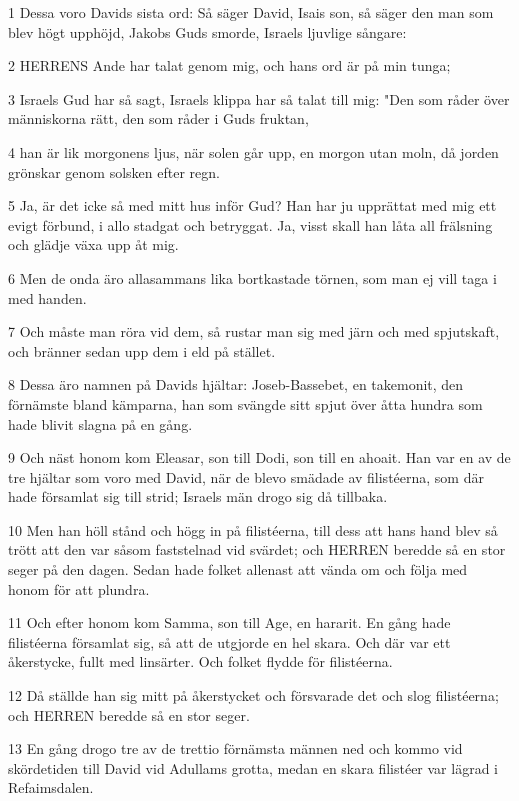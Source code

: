 \par 1 Dessa voro Davids sista ord: Så säger David, Isais son, så säger den man som blev högt upphöjd, Jakobs Guds smorde, Israels ljuvlige sångare:
\par 2 HERRENS Ande har talat genom mig, och hans ord är på min tunga;
\par 3 Israels Gud har så sagt, Israels klippa har så talat till mig: "Den som råder över människorna rätt, den som råder i Guds fruktan,
\par 4 han är lik morgonens ljus, när solen går upp, en morgon utan moln, då jorden grönskar genom solsken efter regn.
\par 5 Ja, är det icke så med mitt hus inför Gud? Han har ju upprättat med mig ett evigt förbund, i allo stadgat och betryggat. Ja, visst skall han låta all frälsning och glädje växa upp åt mig.
\par 6 Men de onda äro allasammans lika bortkastade törnen, som man ej vill taga i med handen.
\par 7 Och måste man röra vid dem, så rustar man sig med järn och med spjutskaft, och bränner sedan upp dem i eld på stället.
\par 8 Dessa äro namnen på Davids hjältar: Joseb-Bassebet, en takemonit, den förnämste bland kämparna, han som svängde sitt spjut över åtta hundra som hade blivit slagna på en gång.
\par 9 Och näst honom kom Eleasar, son till Dodi, son till en ahoait. Han var en av de tre hjältar som voro med David, när de blevo smädade av filistéerna, som där hade församlat sig till strid; Israels män drogo sig då tillbaka.
\par 10 Men han höll stånd och högg in på filistéerna, till dess att hans hand blev så trött att den var såsom faststelnad vid svärdet; och HERREN beredde så en stor seger på den dagen. Sedan hade folket allenast att vända om och följa med honom för att plundra.
\par 11 Och efter honom kom Samma, son till Age, en hararit. En gång hade filistéerna församlat sig, så att de utgjorde en hel skara. Och där var ett åkerstycke, fullt med linsärter. Och folket flydde för filistéerna.
\par 12 Då ställde han sig mitt på åkerstycket och försvarade det och slog filistéerna; och HERREN beredde så en stor seger.
\par 13 En gång drogo tre av de trettio förnämsta männen ned och kommo vid skördetiden till David vid Adullams grotta, medan en skara filistéer var lägrad i Refaimsdalen.
